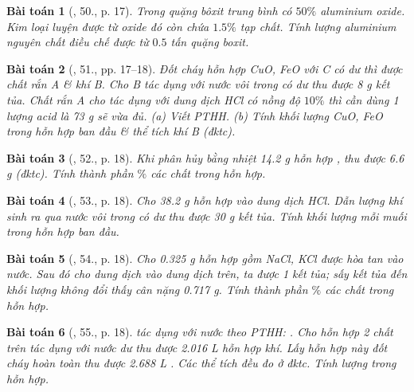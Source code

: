 \documentclass{article}
\newtheorem{baitoan}{Bài toán}
\begin{document}
\begin{baitoan}[\cite{An_400_BT_Hoa_Hoc_9}, 50., p. 17]
	Trong quặng bôxit trung bình có $50\%$ aluminium oxide. Kim loại luyện được từ oxide đó còn chứa $1.5\%$ tạp chất. Tính lượng aluminium nguyên chất điều chế được  từ $0.5$ tấn quặng boxit.
\end{baitoan}

\begin{baitoan}[\cite{An_400_BT_Hoa_Hoc_9}, 51., pp. 17--18]
	Đốt cháy hỗn hợp {\rm CuO, FeO} với {\rm C} có dư thì được chất rắn A \& khí B. Cho B tác dụng với nước vôi trong có dư thu được {\rm8 g} kết tủa. Chất rắn A cho tác dụng với dung dịch {\rm HCl} có nồng độ $10\%$ thì cần dùng 1 lượng acid là {\rm73 g} sẽ vừa đủ. (a) Viết {\rm PTHH}. (b) Tính khối lượng {\rm CuO, FeO} trong hỗn hợp ban đầu \& thể tích khí B (đktc).
\end{baitoan}

\begin{baitoan}[\cite{An_400_BT_Hoa_Hoc_9}, 52., p. 18]
	Khi phân hủy bằng nhiệt {\rm14.2 g} hỗn hợp {\rm{}}, thu được {\rm6.6 g } (đktc). Tính thành phần $\%$ các chất trong hỗn hợp.
\end{baitoan}

\begin{baitoan}[\cite{An_400_BT_Hoa_Hoc_9}, 53., p. 18]
	Cho {\rm38.2 g} hỗn hợp {\rm{}} vào dung dịch {\rm HCl}. Dẫn lượng khí sinh ra qua nước vôi trong có dư thu được {\rm30 g} kết tủa. Tính khối lượng mỗi muối trong hỗn hợp ban đầu.
\end{baitoan}

\begin{baitoan}[\cite{An_400_BT_Hoa_Hoc_9}, 54., p. 18]
	Cho {\rm0.325 g} hỗn hợp gồm {\rm NaCl, KCl} được hòa tan vào nước. Sau đó cho dung dịch {\rm{}} vào dung dịch trên, ta được 1 kết tủa; sấy kết tủa đến khối lượng không đổi thấy cân nặng {\rm0.717 g}. Tính thành phần $\%$ các chất trong hỗn hợp.
\end{baitoan}

\begin{baitoan}[\cite{An_400_BT_Hoa_Hoc_9}, 55., p. 18]
	{\rm{}} tác dụng với nước theo {\rm PTHH: }. Cho hỗn hợp 2 chất trên tác dụng với nước dư thu được {\rm2.016 L} hỗn hợp khí. Lấy hỗn hợp này đốt cháy hoàn toàn thu được {\rm2.688 L }. Các thể tích đều đo ở đktc. Tính lượng {\rm{}} trong hỗn hợp.
\end{baitoan}
\end{document}
